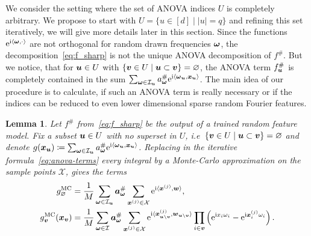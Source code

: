 \documentclass{article}
\renewcommand{\vec}[1]{\ensuremath \mathbf{\boldsymbol{#1}}}
\newcommand{\X}{\ensuremath{\mathcal{X}}}
\newcommand{\w}{\ensuremath{\vec \omega}}
\newcommand{\x}{\ensuremath{\vec x}}
\newcommand{\I}{\ensuremath{\mathcal{I}}}
\newcommand{\e}{\mathrm{e}}
\newcommand{\im}{\mathrm{i}}
\newtheorem{lemma}[theorem]{Lemma}
\theoremstyle{definition}
\numberwithin{equation}{section}
\begin{document}
We consider the setting where the set of ANOVA indices $U$ is completely arbitrary. We propose to start with $U = \{u \in [d] \mid |u| = q\}$ and refining this set iteratively, we will give more details later in this section.
Since the functions $\e^{\im \langle \w,\cdot \rangle}$ are not orthogonal for random drawn frequencies $\w$, the decomposition~\eqref{eq:f_sharp} is not the unique ANOVA decomposition of $f^\#$. But we notice, that for $\vec u\in U$ with $\{\vec v\in U \mid \vec u\subset \vec v \} = \varnothing$, the ANOVA term $f^\#_{\vec u}$ is completely contained in the sum $\sum_{\w\in \I_{\vec u}} a^\#_{\w} \e^{\im\langle \w_{\vec u},\x_{\vec u}\rangle }$. The main idea of our procedure is to calculate, if such an ANOVA term is really necessary or if the indices can be reduced to even lower dimensional sparse random Fourier features.
\begin{lemma}\label{lem:gsi}
Let $f^\#$ from~\eqref{eq:f_sharp} be the output of a trained random feature model.
Fix a subset $\vec u\in U$ with no superset in $U$, i.e~$\{\vec v\in U \mid \vec u\subset \vec v \} = \varnothing$ and denote $g(\vec x_{\vec u})\coloneqq \sum_{\w\in \I_{\vec u}} a^\#_{\w} \e^{\im\langle \w_{\vec u},\x_{\vec u}\rangle } $. 
Replacing in the iterative formula~\eqref{eq:anova-terms} every integral by a Monte-Carlo approximation on the sample points $\X$, gives the terms
\begin{align*}
g^{\text{MC}}_{\varnothing} &= \frac 1M \sum_{\w\in \I_{\vec u}}\vec a^{ \#}_{\w} \sum_{\x^{(j)} \in \X} \e^{\im \langle \vec x^{(j)}, \vec w\rangle},\\
 g^{\text{MC}}_{\vec v}(\vec x_{\vec v}) &= \frac 1M \sum_{\w\in \I}\vec a^{ \#}_{\w} \sum_{\x^{(j)} \in \X} \e^{\im \langle \vec x^{(j)}_{\vec u\backslash \vec v}, \vec w_{\vec u\backslash \vec v}\rangle} \prod_{i\in \vec v} \left(\e^{\im x_i\omega_i} - \e^{\im \vec x_{i}^{(j)}\omega_i}\right).
\end{align*} 
\end{lemma}
\end{document}
